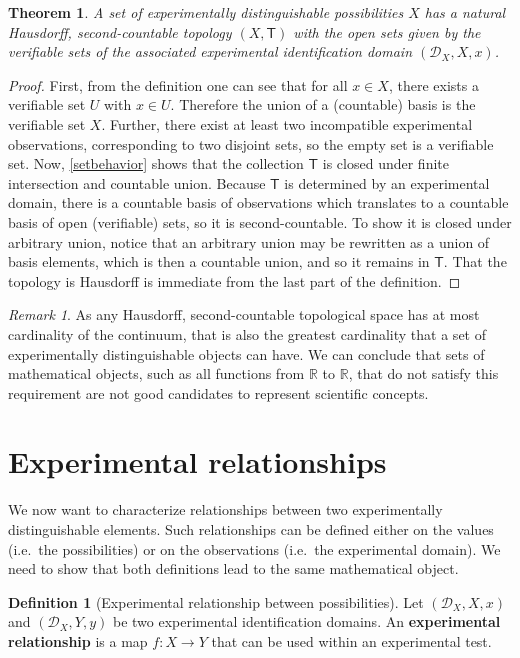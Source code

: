\documentclass[preprint]{elsarticle}
\theoremstyle{plain}%
\newtheorem{thm}{Theorem}[section]
\theoremstyle{definition}
\newtheorem{defn}{Definition}[section]
\theoremstyle{remark}
\newtheorem*{rem}{Remark}
\begin{document}
\begin{thm}
A set of experimentally distinguishable possibilities $X$ has a natural Hausdorff, second-countable topology $(X,\mathsf{T})$ with the open sets given by the verifiable sets of the associated experimental identification domain $(\mathcal{D}_X, X, x)$.
\end{thm}
\begin{proof}
First, from the definition one can see that for all $x\in X$, there exists a verifiable set $U$ with $x\in U$. Therefore the union of a (countable) basis is the verifiable set $X$. Further, there exist at least two incompatible experimental observations, corresponding to two disjoint sets, so the empty set is a verifiable set. Now, \ref{setbehavior} shows that the collection $\mathsf{T}$ is closed under finite intersection and countable union. Because $\mathsf{T}$ is determined by an experimental domain, there is a countable basis of observations which translates to a countable basis of open (verifiable) sets, so it is second-countable. To show it is closed under arbitrary union, notice that an arbitrary union may be rewritten as a union of basis elements, which is then a countable union, and so it remains in $\mathsf{T}$. That the topology is Hausdorff is immediate from the last part of the definition. 
\end{proof}

\begin{rem}
As any Hausdorff, second-countable topological space has at most cardinality of the continuum, that is also the greatest cardinality that a set of experimentally distinguishable objects can have. We can conclude that sets of mathematical objects, such as all functions from $\mathbb{R}$ to $\mathbb{R}$, that do not satisfy this requirement are not good candidates to represent scientific concepts.
\end{rem}

\section{Experimental relationships}

We now want to characterize relationships between two experimentally distinguishable elements. Such relationships can be defined either on the values (i.e.~the possibilities) or on the observations (i.e.~the experimental domain). We need to show that both definitions lead to the same mathematical object.

\begin{defn}[Experimental relationship between possibilities]
	Let $(\mathcal{D}_X, X, x)$ and $(\mathcal{D}_X, Y, y)$ be two experimental identification domains. An \textbf{experimental relationship} is a map $f : X \rightarrow Y$ that can be used within an experimental test.
\end{defn}
\end{document}
